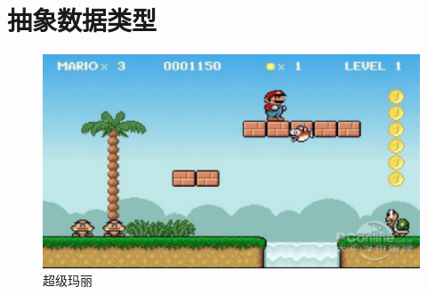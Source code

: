 \section{抽象数据类型}

\begin{frame}
  
    
      
\end{frame}

\begin{frame}
  
    
      
\end{frame}


\begin{frame}
  
    
  
\end{frame}


\begin{frame}
  
        
  
\end{frame}


\begin{frame}
  \begin{figure}
    \includegraphics[width=4.5in]{Chapters/Ch01/Fig/Mario}
    \caption{超级玛丽}      
  \end{figure}
      
\end{frame}

\begin{frame}
  
        
  
\end{frame}
